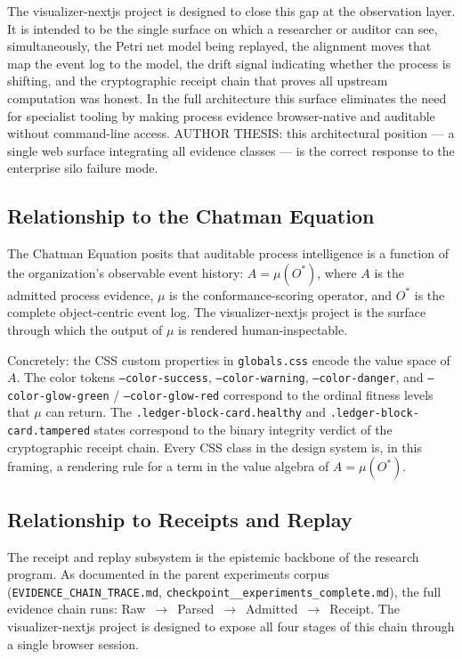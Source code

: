 The visualizer-nextjs project is designed to close this gap at the observation layer. It is
intended to be the single surface on which a researcher or auditor can see, simultaneously,
the Petri net model being replayed, the alignment moves that map the event log to the model,
the drift signal indicating whether the process is shifting, and the cryptographic receipt
chain that proves all upstream computation was honest. In the full architecture this surface
eliminates the need for specialist tooling by making process evidence browser-native and
auditable without command-line access. AUTHOR THESIS: this architectural position --- a
single web surface integrating all evidence classes --- is the correct response to the
enterprise silo failure mode.

\subsection{Relationship to the Chatman Equation}
\label{sec:experiments-visualizer-nextjs-lineage-chatman-eq}

The Chatman Equation posits that auditable process intelligence is a function of the
organization's observable event history: $A = \mu(O^{*})$, where $A$ is the admitted process
evidence, $\mu$ is the conformance-scoring operator, and $O^{*}$ is the complete object-centric
event log. The visualizer-nextjs project is the surface through which the output of $\mu$ is
rendered human-inspectable.

Concretely: the CSS custom properties in \texttt{globals.css} encode the value space of $A$.
The color tokens \texttt{--color-success}, \texttt{--color-warning}, \texttt{--color-danger},
and \texttt{--color-glow-green} / \texttt{--color-glow-red} correspond to the ordinal fitness
levels that $\mu$ can return. The \texttt{.ledger-block-card.healthy} and
\texttt{.ledger-block-card.tampered} states correspond to the binary integrity verdict of the
cryptographic receipt chain. Every CSS class in the design system is, in this framing, a
rendering rule for a term in the value algebra of $A = \mu(O^{*})$.

\subsection{Relationship to Receipts and Replay}
\label{sec:experiments-visualizer-nextjs-lineage-receipts}

The receipt and replay subsystem is the epistemic backbone of the research program. As
documented in the parent experiments corpus (\texttt{EVIDENCE\_CHAIN\_TRACE.md},
\texttt{checkpoint\_\_experiments\_complete.md}), the full evidence chain runs:
Raw~$\to$~Parsed~$\to$~Admitted~$\to$~Receipt. The visualizer-nextjs project is designed to
expose all four stages of this chain through a single browser session.

